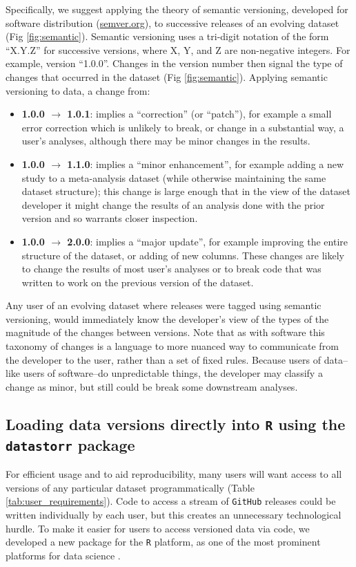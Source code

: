 \documentclass[a4paper,num-refs]{assets/oup-contemporary}
\begin{document}
Specifically, we suggest applying the theory of semantic versioning, developed for software distribution (\href{http://semver.org/}{semver.org}), to successive releases of an evolving dataset (Fig \ref{fig:semantic}). Semantic versioning uses a tri-digit notation of the form ``X.Y.Z'' for successive versions, where X, Y, and Z are non-negative integers. For example, version ``1.0.0''. Changes in the version number then signal the type of changes that occurred in the dataset (Fig \ref{fig:semantic}). Applying semantic versioning to data, a change from:
\begin{itemize}
  \item {\bf 1.0.0 $\rightarrow$ 1.0.1}: implies a ``correction'' (or ``patch''), for example a small error correction which is unlikely to break, or change in a substantial way, a user's analyses, although there may be minor changes in the results.
  \item {\bf 1.0.0 $\rightarrow$ 1.1.0}: implies a ``minor enhancement'', for example adding a new study to a meta-analysis dataset (while otherwise maintaining the same dataset structure); this change is large enough that in the view of the dataset developer it might change the results of an analysis done with the prior version and so warrants closer inspection.
  \item {\bf 1.0.0 $\rightarrow$ 2.0.0}: implies a ``major update'', for example improving the entire structure of the dataset, or adding of new columns. These changes are likely to change the results of most user's analyses or to break code that was written to work on the previous version of the dataset.
\end{itemize}
Any user of an evolving dataset where releases were tagged using semantic versioning, would immediately know the developer's view of the types of the magnitude of the changes between versions.  Note that as with software this taxonomy of changes is a language to more nuanced way to communicate from the developer to the user, rather than a set of fixed rules. Because users of data--like users of software--do unpredictable things, the developer may classify a change as minor, but still could be break some downstream analyses.  

\subsection{Loading data versions directly into \texttt{R} using the \texttt{datastorr} package}

For efficient usage and to aid reproducibility, many users will want access to all versions of any particular dataset programmatically (Table \ref{tab:user_requirements}). Code to access a stream of \texttt{GitHub} releases could be written individually by each user, but this creates an unnecessary technological hurdle. To make it easier for users to access versioned data via code, we developed a new package for the \texttt{R} platform, as one of the most prominent platforms for data science \cite{R-2017}.
\end{document}
